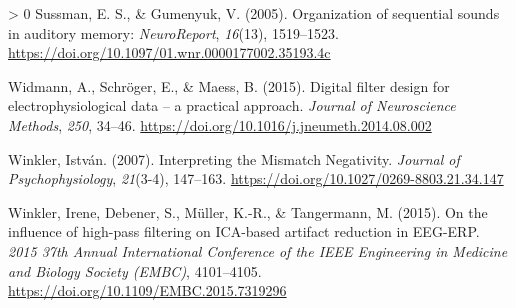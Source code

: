 \documentclass[twoside, man, a4paper,12pt, nofontenc]{apa7}
\newlength{\cslhangindent}
\newenvironment{CSLReferences}[3] %
 {%
  \setlength{\parindent}{0pt}
  \ifodd #1 \everypar{\setlength{\hangindent}{\cslhangindent}}\ignorespaces\fi
  \ifnum #2 > 0
  \setlength{\parskip}{#3\baselineskip}
  \fi
 }%
 {}
\begin{document}
\begin{CSLReferences}{1}{0}
\leavevmode\hypertarget{ref-sussmanOrganizationSequentialSounds2005}{}%
Sussman, E. S., \& Gumenyuk, V. (2005). Organization of sequential
sounds in auditory memory: \emph{NeuroReport}, \emph{16}(13),
1519--1523. \url{https://doi.org/10.1097/01.wnr.0000177002.35193.4c}

\leavevmode\hypertarget{ref-widmannDigitalFilterDesign2015}{}%
Widmann, A., Schröger, E., \& Maess, B. (2015). Digital filter design
for electrophysiological data -- a practical approach. \emph{Journal of
Neuroscience Methods}, \emph{250}, 34--46.
\url{https://doi.org/10.1016/j.jneumeth.2014.08.002}

\leavevmode\hypertarget{ref-winklerInterpretingMismatchNegativity2007}{}%
Winkler, István. (2007). Interpreting the Mismatch Negativity.
\emph{Journal of Psychophysiology}, \emph{21}(3-4), 147--163.
\url{https://doi.org/10.1027/0269-8803.21.34.147}

\leavevmode\hypertarget{ref-winklerInfluenceHighpassFiltering2015}{}%
Winkler, Irene, Debener, S., Müller, K.-R., \& Tangermann, M. (2015). On
the influence of high-pass filtering on ICA-based artifact reduction in
EEG-ERP. \emph{2015 37th Annual International Conference of the IEEE
Engineering in Medicine and Biology Society (EMBC)}, 4101--4105.
\url{https://doi.org/10.1109/EMBC.2015.7319296}

\end{CSLReferences}
\end{document}
